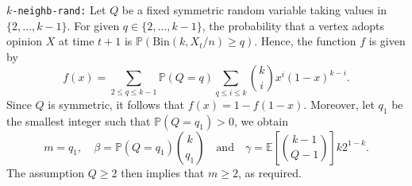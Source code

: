 \documentclass[11pt]{article}
\newcommand{\Bin}{\mathrm{Bin}}
\newcommand{\Prob}{\mathbb{P}}
\numberwithin{theorem}{section}
\begin{document}
\medskip
\noindent
\texttt{$k$-neighb-rand:} Let $Q$ be a fixed symmetric random variable taking values in $\{2,\dots,k-1\}$. For given $q\in\{2,\dots,k-1\}$, the probability that a vertex adopts opinion $X$ at time $t+1$ is $\Prob(\Bin(k,X_t/n)\geq q)$. Hence, the function $f$ is given by
\[
f(x)= \sum_{2\leq q\leq k-1} \Prob(Q=q) \sum_{q\leq i\leq k} \binom{k}{i}x^i (1-x)^{k-i}.
\]
Since $Q$ is symmetric, it follows that $f(x)=1-f(1-x)$. Moreover, let $q_1$ be the smallest integer such that $\Prob(Q=q_1)>0$, we obtain
\[
m = q_1, \quad \beta = \Prob(Q=q_1) \binom{k}{q_1} \quad \text{and} \quad \gamma = \mathbb{E}\left[\binom{k-1}{Q-1}\right]k 2^{1-k}.
\]
The assumption $Q \ge 2$ then implies that $m \ge 2$, as required.








\end{document}
